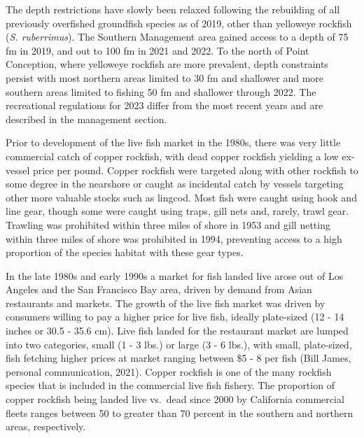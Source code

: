 \documentclass[11pt,
  letterpaper,
]{article}
\begin{document}
The depth restrictions have slowly been relaxed following the rebuilding of all previously overfished groundfish species as of 2019, other than yelloweye rockfish (\emph{S. ruberrimus}). The Southern Management area gained access to a depth of 75 fm in 2019, and out to 100 fm in 2021 and 2022. To the north of Point Conception, where yelloweye rockfish are more prevalent, depth constraints persist with most northern areas limited to 30 fm and shallower and more southern areas limited to fishing 50 fm and shallower through 2022. The recreational regulations for 2023 differ from the most recent years and are described in the management section.

Prior to development of the live fish market in the 1980s, there was very little commercial catch of copper rockfish, with dead copper rockfish yielding a low ex-vessel price per pound. Copper rockfish were targeted along with other rockfish to some degree in the nearshore or caught as incidental catch by vessels targeting other more valuable stocks such as lingcod. Most fish were caught using hook and line gear, though some were caught using traps, gill nets and, rarely, trawl gear. Trawling was prohibited within three miles of shore in 1953 and gill netting within three miles of shore was prohibited in 1994, preventing access to a high proportion of the species habitat with these gear types.

In the late 1980s and early 1990s a market for fish landed live arose out of Los Angeles and the San Francisco Bay area, driven by demand from Asian restaurants and markets. The growth of the live fish market was driven by consumers willing to pay a higher price for live fish, ideally plate-sized (12 - 14 inches or 30.5 - 35.6 cm). Live fish landed for the restaurant market are lumped into two categories, small (1 - 3 lbs.) or large (3 - 6 lbs.), with small, plate-sized, fish fetching higher prices at market ranging between \$5 - 8 per fish (Bill James, personal communication, 2021). Copper rockfish is one of the many rockfish species that is included in the commercial live fish fishery. The proportion of copper rockfish being landed live vs.~dead since 2000 by California commercial fleets ranges between 50 to greater than 70 percent in the southern and northern areas, respectively.
\end{document}
